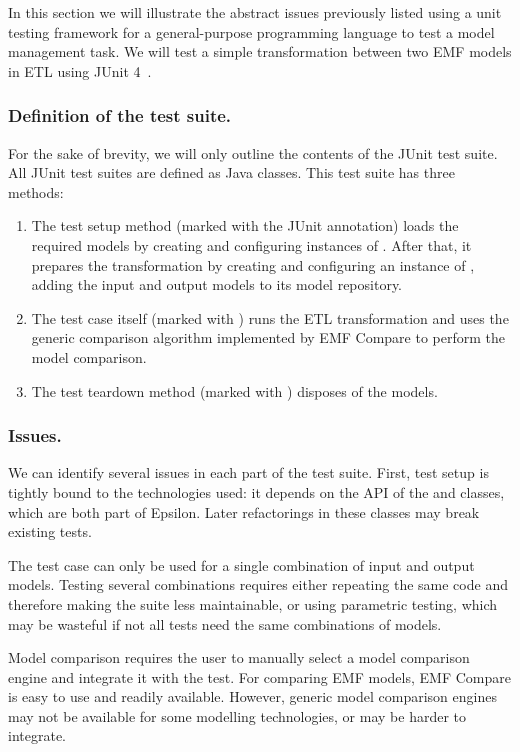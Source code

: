 In this section we will illustrate the abstract issues previously listed using a unit testing framework for a general-purpose programming language to test a model management task. We will test a simple transformation between two EMF models in ETL using JUnit 4~\cite{JUnit2011}.

\subsubsection{Definition of the test suite.} For the sake of brevity, we will only outline the contents of the JUnit test suite. All JUnit test suites are defined as Java classes. This test suite has three methods:

\begin{enumerate}
\item The test setup method (marked with the  JUnit annotation) loads the required models by creating and configuring instances of . After that, it prepares the transformation by creating and configuring an instance of , adding the input and output models to its model repository.

\item The test case itself (marked with ) runs the ETL transformation and uses the generic comparison algorithm implemented by EMF Compare to perform the model comparison.

\item The test teardown method (marked with ) disposes of the models.
\end{enumerate}

\subsubsection{Issues.} We can identify several issues in each part of the test suite. First, test setup is tightly bound to the technologies used: it depends on the API of the  and  classes, which are both part of Epsilon. Later refactorings in these classes may break existing tests.

The test case can only be used for a single combination of input and output models. Testing several combinations requires either repeating the same code and therefore making the suite less maintainable, or using parametric testing, which may be wasteful if not all tests need the same combinations of models.

Model comparison requires the user to manually select a model comparison engine and integrate it with the test. For comparing EMF models, EMF Compare is easy to use and readily available. However, generic model comparison engines may not be available for some modelling technologies, or may be harder to integrate.

